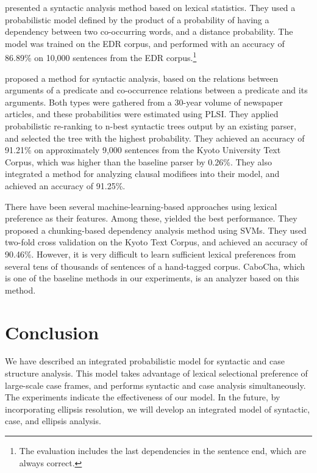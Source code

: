 \documentclass[english]{jnlp_1.4_rep}
\begin{document}
 presented a syntactic analysis method based on
lexical statistics. They used a probabilistic
model defined by the product of a probability of having a dependency
between two co-occurring words, and a distance probability. The model was
trained on the EDR corpus, and performed with an accuracy of 86.89\% on 10,000
sentences from the EDR corpus.\footnote{The evaluation includes the last
dependencies in the sentence end, which are always correct.}

 proposed a method for syntactic analysis, based on
the relations between arguments of a predicate and co-occurrence relations
between a predicate and its arguments. Both types
were gathered from a 30-year volume of newspaper
articles, and these probabilities were estimated using PLSI. They applied
probabilistic re-ranking to n-best syntactic trees output by an existing
parser, and selected the tree with the highest probability. They
achieved an accuracy of 91.21\% on approximately 9,000 sentences from
the Kyoto University Text Corpus, which was higher than the baseline
parser by 0.26\%. They also integrated a method for analyzing clausal
modifiees \cite{Abekawa2005} into their model, and achieved an accuracy of 91.25\%.

There have been several machine-learning-based
approaches using lexical preference as 
\linebreak
their features. Among these,  yielded the best performance. They
proposed a chunking-based dependency analysis method using SVMs.
They used two-fold cross validation on the Kyoto Text
Corpus, and achieved an accuracy of 90.46\%. However, it is very difficult to
learn sufficient lexical preferences from several tens of thousands of
sentences of a hand-tagged corpus. CaboCha, which is one of the baseline
methods in our experiments, is an analyzer based on this method.


\section{Conclusion}

We have described an integrated probabilistic model for syntactic and
case structure analysis. This model takes advantage of lexical
selectional preference of large-scale case frames, and performs
syntactic and case analysis simultaneously. The experiments indicate
the effectiveness of our model. In the future, by incorporating ellipsis
resolution, we will develop an integrated model of syntactic, case, and
ellipsis analysis.
\end{document}
